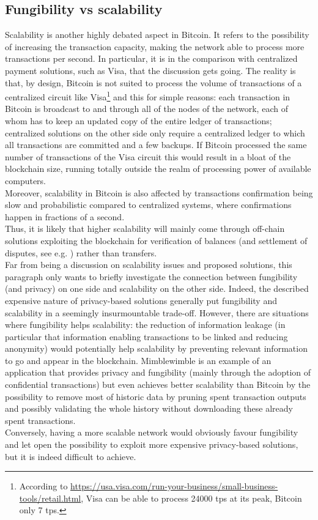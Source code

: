 \subsection{Fungibility vs scalability}
Scalability is another highly debated aspect in Bitcoin. It refers to the possibility of increasing the transaction capacity, making the network able to process more transactions per second. In particular, it is in the comparison with centralized payment solutions, such as Visa, that the discussion gets going. The reality is that, by design, Bitcoin is not suited to process the volume of transactions of a centralized circuit like Visa\footnote{According to \url{https://usa.visa.com/run-your-business/small-business-tools/retail.html}, Visa can be able to process 24000 tps at its peak, Bitcoin only 7 tps.} and this for simple reasons: each transaction in Bitcoin is broadcast to and through all of the nodes of the network, each of whom has to keep an updated copy of the entire ledger of transactions; centralized solutions on the other side only require a centralized ledger to which all transactions are committed and a few backups. If Bitcoin processed the same number of transactions of the Visa circuit this would result in a bloat of the blockchain size, running totally outside the realm of processing power of available computers. \\
Moreover, scalability in Bitcoin is also affected by transactions confirmation being slow and probabilistic compared to centralized systems, where confirmations happen in fractions of a second.\\ Thus, it is likely that higher scalability will mainly come through off-chain solutions exploiting the blockchain for verification of balances (and settlement of disputes, see e.g. \cite{RefWork:18}) rather than transfers.\\
Far from being a discussion on scalability issues and proposed solutions, this paragraph only wants to briefly investigate the connection between fungibility (and privacy) on one side and scalability on the other side. Indeed, the described expensive nature of privacy-based solutions generally put fungibility and scalability in a seemingly insurmountable trade-off. However, there are situations where fungibility helps scalability: the reduction of information leakage (in particular that information enabling transactions to be linked and reducing anonymity) would potentially help scalability by preventing relevant information to go and appear in the blockchain. Mimblewimble \cite{MW} is an example of an application that provides privacy and fungibility (mainly through the adoption of confidential transactions) but even achieves better scalability than Bitcoin by the possibility to remove most of historic data by pruning spent transaction outputs and possibly validating the whole history without downloading these already spent transactions.\\
Conversely, having a more scalable network would obviously favour fungibility and let open the possibility to exploit more expensive privacy-based solutions, but it is indeed difficult to achieve.